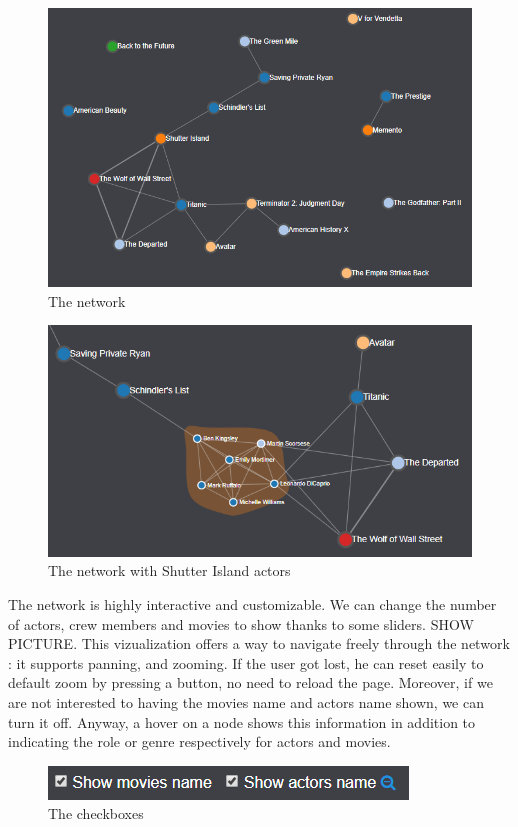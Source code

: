 \documentclass[a4paper,10pt]{article}
\begin{document}
\begin{figure}[ht]
   \centering
   \includegraphics[width=0.6\linewidth]{images/screens/network-movies.png}
  \caption{The network} \label{fig:screen-network-movies}
\end{figure}

\begin{figure}[ht]
   \centering
   \includegraphics[width=0.6\linewidth]{images/screens/network-movies-shutter-island.png}
  \caption{The network with Shutter Island actors} \label{fig:screen-network-movies-shutter-island}
\end{figure}

The network is highly interactive and customizable. We can change the number of actors,
crew members and movies to show thanks to some sliders. SHOW PICTURE.
This vizualization offers a way to navigate freely through the network : it supports panning,
and zooming. If the user got lost, he can reset easily to default zoom by pressing a button, no
need to reload the page. Moreover, if we are not interested to having the movies name and actors name shown,
we can turn it off. Anyway, a hover on a node shows this information in addition to
indicating the role or genre respectively for actors and movies.

\begin{figure}[ht]
   \centering
   \includegraphics[width=0.6\linewidth]{images/screens/network-movies-checkboxes.png}
  \caption{The checkboxes} \label{fig:screen-network-movies-checkboxes}
\end{figure}
\end{document}

